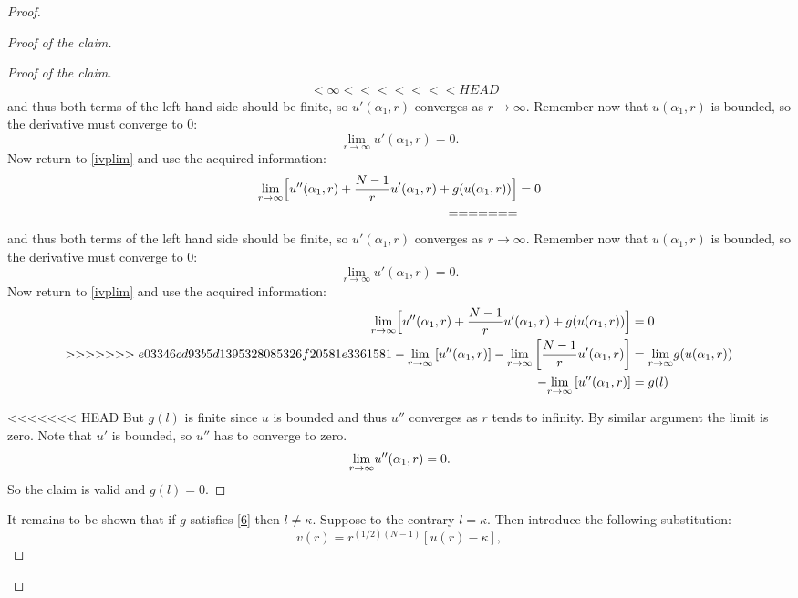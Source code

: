 \begin{lemma}
\begin{proof}
\begin{proof}[Proof of the claim]
\begin{proof}[Proof of the claim]
\begin{align*}
        &<\infty
<<<<<<< HEAD
\end{align*}
and thus both terms of the left hand side should be finite, so $u'(\alpha_1,r)$ converges as $r\to\infty.$ Remember now that $u(\alpha_1,r)$ is bounded, so the derivative must converge to 0: $$\underset{r\to\infty}{\lim}u'(\alpha_1,r)=0.$$ Now return to \eqref{ivplim} and use the acquired information:
\begin{align*}
	\underset{r\to\infty}{\lim}\Big[u''(\alpha_1,r)+\frac{N-1}{r}u'(\alpha_1,r)+g(u(\alpha_1,r))\Big]&=0\\
=======
\end{align*} 
and thus both terms of the left hand side should be finite, so $u'(\alpha_1,r)$ converges as $r\to\infty.$ Remember now that $u(\alpha_1,r)$ is bounded, so the derivative must converge to 0: $$\underset{r\to\infty}{\lim}u'(\alpha_1,r)=0.$$ Now return to \eqref{ivplim} and use the acquired information: 
\begin{align*}
	\underset{r\to\infty}{\lim}\Big[u''(\alpha_1,r)+\frac{N-1}{r}u'(\alpha_1,r)+g(u(\alpha_1,r))\Big]&=0\\ 
>>>>>>> e03346cd93b5d1395328085326f20581e3361581
	-\underset{r\to\infty}{\lim}\left[u''(\alpha_1,r)\right]
    -\underset{r\to\infty}{\lim}\left[\frac{N-1}{r}u'(\alpha_1,r)\right]&=\underset{r\to\infty}{\lim} g(u(\alpha_1,r))\\
	-\underset{r\to\infty}{\lim}\left[u''(\alpha_1,r)\right]&=g(l)
\end{align*}

<<<<<<< HEAD
But $g(l)$ is finite since $u$ is bounded and thus $u''$ converges as $r$ tends to infinity. By similar argument the limit is zero. Note that $u'$ is bounded, so $u''$ has to converge to zero. $$\underset{r\to\infty}{\lim} u''(\alpha_1,r)=0.$$ So the claim is valid and $g(l)=0$.\end{proof}

It remains to be shown that if $g$ satisfies \eqref{6} then $l\neq\kappa.$ Suppose to the contrary $l=\kappa$. Then introduce the following substitution:
$$v(r)=r^{(1/2)(N-1)}\left[u(r)-\kappa\right],$$


\end{proof}
\end{proof}
\end{lemma}
